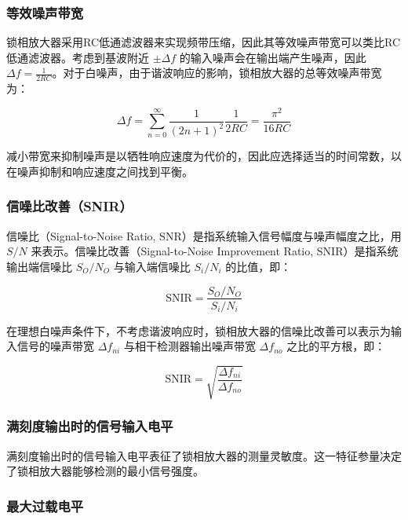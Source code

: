 \documentclass[12pt,a4paper]{article}
\begin{document}
\subsubsection{等效噪声带宽}

锁相放大器采用RC低通滤波器来实现频带压缩，因此其等效噪声带宽可以类比RC低通滤波器。考虑到基波附近 $\pm\Delta f$ 的输入噪声会在输出端产生噪声，因此 $\Delta f = \frac{1}{2RC}$。对于白噪声，由于谐波响应的影响，锁相放大器的总等效噪声带宽为：

\begin{equation}
\Delta f = \sum_{n=0}^{\infty} \frac{1}{(2n+1)^2} \frac{1}{2RC} = \frac{\pi^2}{16RC}
\end{equation}

减小带宽来抑制噪声是以牺牲响应速度为代价的，因此应选择适当的时间常数，以在噪声抑制和响应速度之间找到平衡。

\subsubsection{信噪比改善（SNIR）}

信噪比（Signal-to-Noise Ratio, SNR）是指系统输入信号幅度与噪声幅度之比，用 $S/N$ 来表示。信噪比改善（Signal-to-Noise Improvement Ratio, SNIR）是指系统输出端信噪比 $S_O/N_O$ 与输入端信噪比 $S_i/N_i$ 的比值，即：

\begin{equation}
\text{SNIR} = \frac{S_O/N_O}{S_i/N_i}
\end{equation}

在理想白噪声条件下，不考虑谐波响应时，锁相放大器的信噪比改善可以表示为输入信号的噪声带宽 $\Delta f_{ni}$ 与相干检测器输出噪声带宽 $\Delta f_{no}$ 之比的平方根，即：

\begin{equation}
\text{SNIR} = \sqrt{\frac{\Delta f_{ni}}{\Delta f_{no}}}
\end{equation}

\subsubsection{满刻度输出时的信号输入电平}

满刻度输出时的信号输入电平表征了锁相放大器的测量灵敏度。这一特征参量决定了锁相放大器能够检测的最小信号强度。

\subsubsection{最大过载电平}
\end{document}
